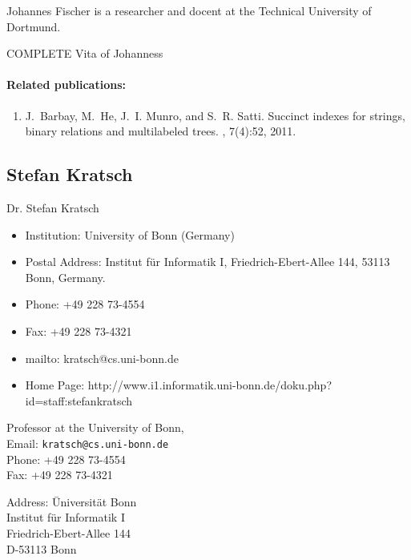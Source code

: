 \documentclass[a4paper,10pt]{article}
\begin{document}
Johannes Fischer  is a researcher and docent at the Technical University of Dortmund.
\begin{TODO}
COMPLETE Vita of Johanness
\end{TODO}

\paragraph{Related publications:}
\begin{enumerate}
\item
J.~Barbay, M.~He, J.~I. Munro, and S.~R. Satti.
\newblock Succinct indexes for strings, binary relations and multilabeled
  trees.
 , 7(4):52, 2011.
\end{enumerate}

\subsection*{Stefan Kratsch}

Dr. Stefan Kratsch
  \begin{itemize}
\item Institution: University of Bonn (Germany)
\item Postal Address: Institut f\"ur Informatik I, Friedrich-Ebert-Allee 144, 53113 Bonn, Germany.
\item Phone: +49 228 73-4554
\item Fax: +49 228 73-4321 
\item mailto: kratsch@cs.uni-bonn.de
\item Home Page: http://www.i1.informatik.uni-bonn.de/doku.php?id=staff:stefankratsch
  \end{itemize}

\begin{multicols}{2}
\noindent Professor at the University of Bonn, \\
Email: \texttt{kratsch@cs.uni-bonn.de} \\
Phone: +49 228 73-4554\\
Fax: +49 228 73-4321
\begin{tabbing}
Address: \= Universit\"at Bonn\\
\> Institut f\"ur Informatik I\\
\> Friedrich-Ebert-Allee 144\\
\> D-53113 Bonn
\end{tabbing}
\end{multicols}
\end{document}
